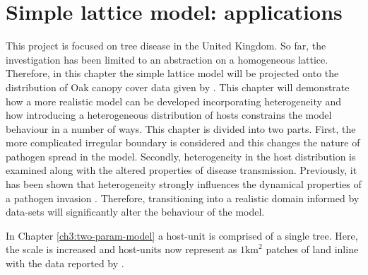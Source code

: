 
\chapter{Simple lattice model: applications}
\label{chapter:SLM-applications}

This project is focused on tree disease in the United Kingdom. %
So far, the investigation has been limited to an abstraction on a homogeneous lattice. %
Therefore, in this chapter the simple lattice model will be projected onto the distribution of Oak canopy cover data given %
by \cite{hill.data}. %
This chapter will demonstrate how a more realistic model can be developed %
incorporating heterogeneity and how %
introducing a heterogeneous distribution of hosts constrains the model behaviour %
in a number of ways. %
This chapter is divided into two parts. %
First, the more complicated irregular boundary is considered and this changes the nature of pathogen%
 spread in the model. %
Secondly,  heterogeneity in the host distribution is examined along with the altered properties %
of disease transmission. %
Previously, it has been shown that heterogeneity strongly influences the  dynamical properties %
of a pathogen invasion \cite{madden1995plant}. %
Therefore, transitioning into a realistic domain informed by data-sets will significantly %
alter the  behaviour of the model.  %

In Chapter \ref{ch3:two-param-model} a host-unit is comprised of a single tree. %
Here, the scale is increased and host-units now represent as  $1\mathrm{km}^2$ patches of land \textemdash inline with the data reported by \cite{hill.data}. %


